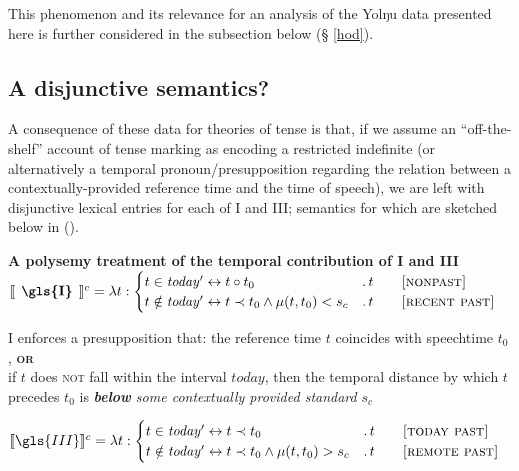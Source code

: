 This phenomenon and its relevance for an analysis of the Yolŋu data presented here is  further considered in the subsection below (§ \ref{hod}).





\subsection{A disjunctive semantics?}
A consequence of these data for theories of tense is that, if we assume an ``off-the-shelf'' account of tense marking as encoding a restricted indefinite (or alternatively a temporal pronoun/presupposition regarding the relation between a contextually-provided reference time and the time of speech), we are left with disjunctive lexical entries for each of \gls{I} and \gls{III}; semantics for which are sketched below in (\nextx).


\pex\textbf{A polysemy treatment of the temporal contribution of \gls{I} and \gls{III}}\a$\llbracket\textbf{\phantom{I}\gls{I}\phantom{I}}\rrbracket^{c}=\lambda t:\begin{cases}t\in \mathit{today'}\leftrightarrow t\circ t_0&.\,t\qquad\textsc{[nonpast]}\\
	t\notin \mathit{today'} \leftrightarrow t\prec t_0\wedge\mu(t,t_0)<s_c&.\,t\qquad\textsc{[recent past]}
\end{cases}$

\gls{I} enforces a presupposition that: the reference time $ t $ coincides with speech\-time $ t_0 $, \textbf{\textsc{or}}\\ if $ t $ does \textsc{not} fall within the interval $ \mathit{today} $, then the temporal distance by which $ t $ precedes $ t_0 $ is \textit{\textbf{below} some contextually provided standard} $ s_c $

\a$\llbracket\gls{III}\rrbracket^{c}=\lambda t:\begin{cases}t\in \mathit{today'}\leftrightarrow t\prec t_0&.\,t\qquad\textsc{[today past]}\\
	t\notin \mathit{today'} \leftrightarrow t\prec t_0\wedge\mu(t,t_0)>s_c&.\,t\qquad\textsc{[remote past]}
\end{cases}$

